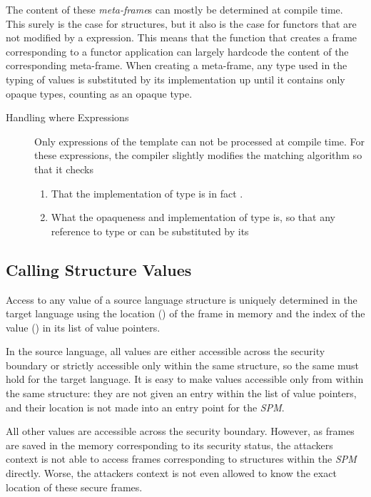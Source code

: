 The content of these \emph{meta-frame}s can mostly be determined at compile time. This surely is the case for structures, but it also is the case for functors that are not modified by a  expression.
This means that the function that creates a frame corresponding to a functor application can largely hardcode the content of the corresponding meta-frame.
When creating a meta-frame, any type used in the typing of values is substituted by its implementation up until it contains only opaque types, counting  as an opaque type.

\begin{description}
\item[Handling where Expressions] 
Only  expressions of the template  can not be processed at compile time.
For these expressions, the compiler slightly modifies the matching algorithm so that it checks
\begin{enumerate}
\item That the implementation of type  is in fact .
\item What the opaqueness and implementation of type  is, so that any reference to type  or  can be substituted by its
\end{enumerate}
\end{description}
\subsection{Calling Structure Values}
Access to any value of a source language structure is uniquely determined in the target language using the location () of the frame in memory and the index of the value () in its list of value pointers.

In the source language, all values are either accessible across the security boundary or strictly accessible only within the same structure, so the same must hold for the target language.
It is easy to make values accessible only from within the same structure: they are not given an entry within the list of value pointers, and their location is not made into an entry point for the \emph{SPM}.

All other values are accessible across the security boundary. However, as frames are saved in the memory corresponding to its security status, the attackers context is not able to access frames corresponding to structures within the \emph{SPM} directly.
Worse, the attackers context is not even allowed to know the exact location  of these secure frames.

